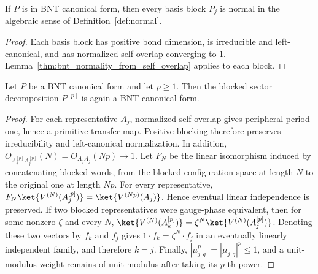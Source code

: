 \begin{lemma}
    \label{cor:sector_bnt_cf_basis_normal}
    \leanok
    If $P$ is in BNT canonical form, then every basis block $P_j$ is normal
    in the algebraic sense of Definition~\ref{def:normal}.
\end{lemma}

\begin{proof}\leanok
    Each basis block has positive bond dimension, is irreducible and
    left-canonical, and has normalized self-overlap converging to $1$.
    Lemma~\ref{thm:bnt_normality_from_self_overlap} applies to each block.
\end{proof}

\begin{lemma}
    \label{thm:sector_bnt_cf_block_tensor}
    \leanok
    Let $P$ be a BNT canonical form and let $p\geq1$. Then the blocked
    sector decomposition $P^{[p]}$ is again a BNT canonical form.
\end{lemma}

\begin{proof}
    \leanok
    For each representative $A_j$, normalized self-overlap gives peripheral
    period one, hence a primitive transfer map. Positive blocking therefore
    preserves irreducibility and left-canonical normalization. In addition,
    $O_{A_j^{[p]}A_j^{[p]}}(N)=O_{A_jA_j}(Np)\longrightarrow1$.
    Let $F_N$ be the linear isomorphism induced by concatenating blocked words,
    from the blocked configuration space at length $N$ to the original one at
    length $Np$. For every representative,
    $F_N\ket{V^{(N)}(A_j^{[p]})}=\ket{V^{(Np)}(A_j)}$.
    Hence eventual linear independence is preserved. If two blocked
    representatives were gauge-phase equivalent, then for some nonzero
    $\zeta$ and every $N$,
    $\ket{V^{(N)}(A_k^{[p]})}
        =\zeta^N\ket{V^{(N)}(A_j^{[p]})}$.
    Denoting these two vectors by $f_k$ and $f_j$ gives
    $1\cdot f_k=\zeta^N\cdot f_j$ in an eventually linearly independent
    family, and therefore $k=j$. Finally,
    $|\mu_{j,q}^p|=|\mu_{j,q}|^p\leq1$, and a unit-modulus weight remains of
    unit modulus after taking its $p$-th power.
\end{proof}

